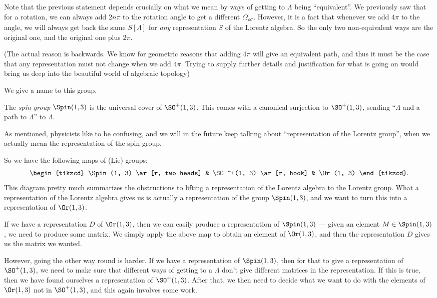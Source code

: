 \documentclass[a4paper]{article}
\begin{document}
Note that the previous statement depends crucially on what we mean by ways of getting to $\Lambda$ being ``equivalent''. We previously saw that for a rotation, we can always add $2n\pi$ to the rotation angle to get a different $\Omega_{\rho\sigma}$. However, it is a fact that whenever we add $4\pi$ to the angle, we will always get back the same $S[\Lambda]$ for \emph{any} representation $S$ of the Lorentz algebra. So the only two non-equivalent ways are the original one, and the original one plus $2\pi$.

(The actual reason is backwards. We know for geometric reasons that adding $4\pi$ will give an equivalent path, and thus it must be the case that any representation must not change when we add $4\pi$. Trying to supply further details and justification for what is going on would bring us deep into the beautiful world of algebraic topology)

We give a name to this group.
\begin{defi}
  The \emph{spin group} $\Spin(1, 3)$ is the universal cover of $\SO^+(1, 3)$. This comes with a canonical surjection to $\SO^+(1, 3)$, sending ``$\Lambda$ and a path to $\Lambda$'' to $\Lambda$.
\end{defi}
As mentioned, physicists like to be confusing, and we will in the future keep talking about ``representation of the Lorentz group'', when we actually mean the representation of the spin group.

So we have the following maps of (Lie) groups:
\[
  \begin{tikzcd}
    \Spin(1, 3) \ar[r, two heads] & \SO^+(1, 3) \ar[r, hook] & \Or(1, 3)
  \end{tikzcd}.
\]
This diagram pretty much summarizes the obstructions to lifting a representation of the Lorentz algebra to the Lorentz group. What a representation of the Lorentz algebra gives us is actually a representation of the group $\Spin(1, 3)$, and we want to turn this into a representation of $\Or(1, 3)$.

If we have a representation $D$ of $\Or(1, 3)$, then we can easily produce a representation of $\Spin(1, 3)$ --- given an element $M \in \Spin(1, 3)$, we need to produce some matrix. We simply apply the above map to obtain an element of $\Or(1, 3)$, and then the representation $D$ gives us the matrix we wanted.

However, going the other way round is harder. If we have a representation of $\Spin(1, 3)$, then for that to give a representation of $\SO^+(1, 3)$, we need to make sure that different ways of getting to a $\Lambda$ don't give different matrices in the representation. If this is true, then we have found ourselves a representation of $\SO^+(1, 3)$. After that, we then need to decide what we want to do with the elements of $\Or(1, 3)$ not in $\SO^+(1, 3)$, and this again involves some work.
\end{document}
